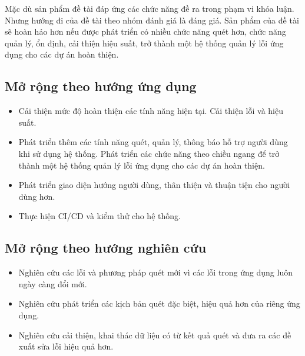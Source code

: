 Mặc dù sản phẩm đề tài đáp ứng các chức năng đề ra trong phạm vi khóa luận. Nhưng hướng đi của đề tài theo nhóm đánh giá là đáng giá. Sản phẩm của đề tài sẽ hoàn hảo hơn nếu được phát triển có nhiều chức năng quét hơn, chức năng quản lý, ổn định, cải thiện hiệu suất, trở thành một hệ thống quản lý lỗi ứng dụng cho các dự án hoàn thiện.

\subsection{Mở rộng theo hướng ứng dụng}

\begin{itemize}
    \item Cải thiện mức độ hoàn thiện các tính năng hiện tại. Cải thiện lỗi và hiệu suất.
    \item Phát triển thêm các tính năng quét, quản lý, thông báo hỗ trợ người dùng khi sử dụng hệ thống. Phát triển các chức năng theo chiều ngang để trở thành một hệ thống quản lý lỗi ứng dụng cho các dự án hoàn thiện.
    \item Phát triển giao diện hướng người dùng, thân thiện và thuận tiện cho người dùng hơn.
    \item Thực hiện CI/CD và kiểm thử cho hệ thống.
\end{itemize}

\subsection{Mở rộng theo hướng nghiên cứu}

\begin{itemize}
    \item Nghiên cứu các lỗi và phương pháp quét mới vì các lỗi trong ứng dụng luôn ngày càng đổi mới.
    \item Nghiên cứu phát triển các kịch bản quét đặc biệt, hiệu quả hơn của riêng ứng dụng.
    \item Nghiên cứu cải thiện, khai thác dữ liệu có từ kết quả quét và đưa ra các đề xuất sửa lỗi hiệu quả hơn.
\end{itemize}